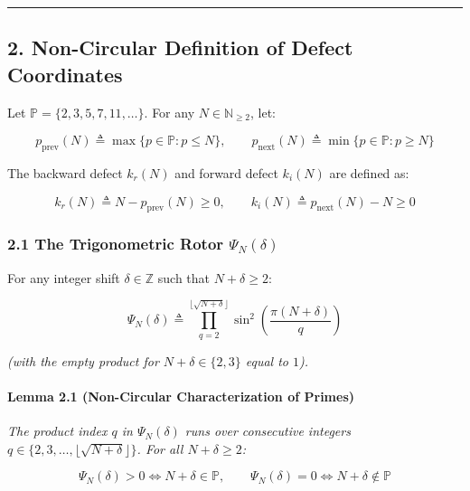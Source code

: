 \documentclass[
  11pt,
]{article}
\begin{document}
\begin{center}\rule{0.5\linewidth}{0.5pt}\end{center}

\subsection{2. Non-Circular Definition of Defect
Coordinates}\label{non-circular-definition-of-defect-coordinates}

Let \(\mathbb{P} = \{2, 3, 5, 7, 11, \dots\}\). For any
\(N \in \mathbb{N}_{\ge 2}\), let:

\[p_{\text{prev}}(N) \triangleq \max \{p \in \mathbb{P} : p \le N\}, \qquad p_{\text{next}}(N) \triangleq \min \{p \in \mathbb{P} : p \ge N\}\]

The backward defect \(k_r(N)\) and forward defect \(k_i(N)\) are defined
as:

\[k_r(N) \triangleq N - p_{\text{prev}}(N) \ge 0, \qquad k_i(N) \triangleq p_{\text{next}}(N) - N \ge 0\]

\subsubsection{\texorpdfstring{2.1 The Trigonometric Rotor
\(\Psi_N(\delta)\)}{2.1 The Trigonometric Rotor \textbackslash Psi\_N(\textbackslash delta)}}\label{the-trigonometric-rotor-psi_ndelta}

For any integer shift \(\delta \in \mathbb{Z}\) such that
\(N + \delta \ge 2\):

\[\Psi_N(\delta) \triangleq \prod_{q=2}^{\lfloor\sqrt{N+\delta}\rfloor} \sin^2\left(\frac{\pi (N + \delta)}{q}\right)\]

\emph{(with the empty product for \(N+\delta \in \{2, 3\}\) equal to
\(1\)).}

\paragraph{Lemma 2.1 (Non-Circular Characterization of
Primes)}\label{lemma-2.1-non-circular-characterization-of-primes}

\emph{The product index \(q\) in \(\Psi_N(\delta)\) runs over
consecutive integers
\(q \in \{2, 3, \dots, \lfloor\sqrt{N+\delta}\rfloor\}\). For all
\(N+\delta \ge 2\):}

\[\Psi_N(\delta) > 0 \iff N + \delta \in \mathbb{P}, \qquad \Psi_N(\delta) = 0 \iff N + \delta \notin \mathbb{P}\]
\end{document}
